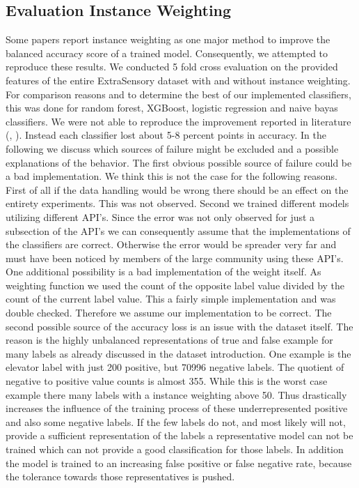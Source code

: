 \subsection{Evaluation Instance Weighting}

Some papers report instance weighting as one major method to improve the balanced accuracy score of a trained model. Consequently, we attempted to reproduce these results. We conducted 5 fold cross evaluation on the provided features of the entire ExtraSensory dataset with and without instance weighting. For comparison reasons and to determine the best of our implemented classifiers, this was done for random forest, XGBoost, logistic regression and naive bayas classifiers. 
We were not able to reproduce the improvement reported in literature (\cite{Vaizman18}, \cite{Saeed18}). Instead each classifier lost about 5-8 percent points in accuracy. In the following we discuss which sources of failure might be excluded and a possible explanations of the behavior. 
The first obvious possible source of failure could be a bad implementation. We think this is not the case for the following reasons. First of all if the data handling would be wrong there should be an effect on the entirety experiments. This was not observed. Second we trained different models utilizing different API's. Since the error was not only observed for just a subsection of the API's we can consequently assume that the implementations of the classifiers are correct. Otherwise the error would be spreader very far and must have been noticed by members of the large community using these API's. One additional possibility is a bad implementation of the weight itself. As weighting function we used the count of the opposite label value divided by the count of the current label value. This a fairly simple implementation and was double checked. Therefore we assume our implementation to be correct. 
The second possible source of the accuracy loss is an issue with the dataset itself. The reason is the highly unbalanced representations of true and false example for many labels as already discussed in the dataset introduction. One example is the elevator label with just 200 positive, but 70996 negative labels. The quotient of negative to positive value counts is almost 355. While this is the worst case example there many labels with a instance weighting above 50. Thus drastically increases the influence of the training process of these underrepresented positive and also some negative labels. If the few labels do not, and most likely will not, provide a sufficient representation of the labels a representative model can not be trained which can not provide a good classification for those labels. In addition the model is trained to an increasing false positive or false negative rate, because the tolerance towards those representatives is pushed.
